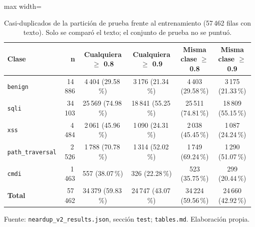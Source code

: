 \begin{table}[htbp]
\centering
\footnotesize
\setlength{\tabcolsep}{3pt}
\begin{adjustbox}{max width=\linewidth}
\begin{tabular}{|l|r|c|c|c|c|}
\hline
\textbf{Clase} & \textbf{n} & \textbf{Cualquiera $\geq$ 0.8} & \textbf{Cualquiera $\geq$ 0.9} & \textbf{Misma clase $\geq$ 0.8} & \textbf{Misma clase $\geq$ 0.9} \\ \hline
\texttt{benign} & 14\,886 & 4\,404 (29.58\,\%) & 3\,176 (21.34\,\%) & 4\,403 (29.58\,\%) & 3\,175 (21.33\,\%) \\ \hline
\texttt{sqli} & 34\,103 & 25\,569 (74.98\,\%) & 18\,841 (55.25\,\%) & 25\,511 (74.81\,\%) & 18\,809 (55.15\,\%) \\ \hline
\texttt{xss} & 4\,484 & 2\,061 (45.96\,\%) & 1\,090 (24.31\,\%) & 2\,038 (45.45\,\%) & 1\,087 (24.24\,\%) \\ \hline
\texttt{path\_traversal} & 2\,526 & 1\,788 (70.78\,\%) & 1\,314 (52.02\,\%) & 1\,749 (69.24\,\%) & 1\,290 (51.07\,\%) \\ \hline
\texttt{cmdi} & 1\,463 & 557 (38.07\,\%) & 326 (22.28\,\%) & 523 (35.75\,\%) & 299 (20.44\,\%) \\ \hline
\textbf{Total} & 57\,462 & 34\,379 (59.83\,\%) & 24\,747 (43.07\,\%) & 34\,224 (59.56\,\%) & 24\,660 (42.92\,\%) \\ \hline
\end{tabular}
\end{adjustbox}
\caption{Casi-duplicados de la partición de prueba frente al entrenamiento (57\,462 filas con texto). Solo se comparó el texto; el conjunto de prueba no se puntuó.}
\label{tabla:anexo-casi-test}
\par\smallskip\footnotesize Fuente: \texttt{neardup\_v2\_results.json}, sección \texttt{test}; \texttt{tables.md}. Elaboración propia.
\end{table}


